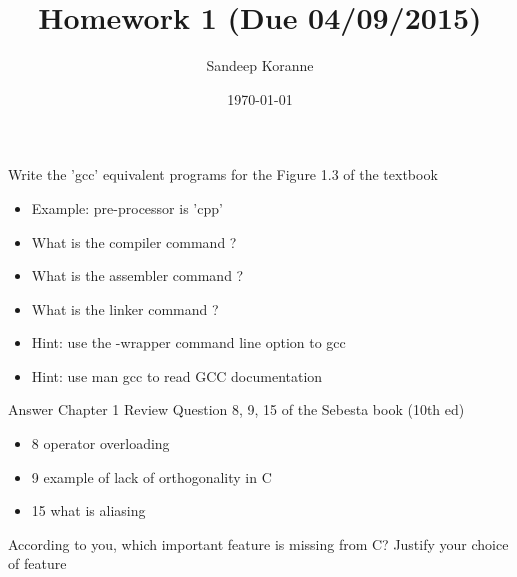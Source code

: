 \documentclass[bigger]{beamer}
\author{Sandeep Koranne}
\date{\today}
\title{Homework 1 (Due 04/09/2015)}
\begin{document}
\maketitle

\begin{frame}[label=sec-1]{Write the 'gcc' equivalent programs for the Figure 1.3 of the textbook}
\begin{itemize}
\item Example: pre-processor is 'cpp'
\item What is the compiler command ?
\item What is the assembler command ?
\item What is the linker command ?
\item Hint: use the -wrapper command line option to gcc
\item Hint: use man gcc to read GCC documentation
\end{itemize}
\end{frame}

\begin{frame}[label=sec-2]{Answer Chapter 1 Review Question 8, 9, 15 of the Sebesta book (10th ed)}
\begin{itemize}
\item 8 operator overloading
\item 9 example of lack of orthogonality in C
\item 15 what is aliasing
\end{itemize}
\end{frame}

\begin{frame}[label=sec-3]{According to you, which important feature is missing from C? Justify your choice of feature}
\end{frame}
\end{document}
